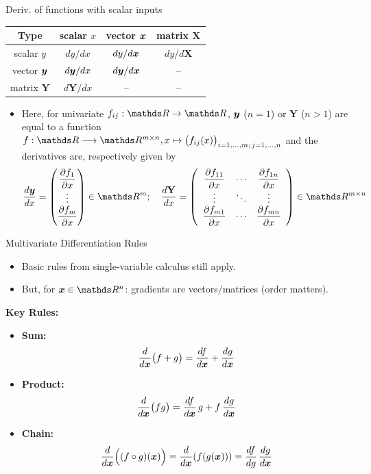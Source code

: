 \documentclass[11pt,compress,t,notes=noshow, xcolor=table]{beamer}
\begin{document}
\begin{framev}{Deriv. of functions with scalar inputs}
\begin{table}
\centering
\begin{tabular}{c||c|c|c}
Type & scalar $x$ & vector $\bm{x}$ & matrix $\mathbf{X}$ \\ \hline\hline
scalar $y$ & $d y / d x$ & $d y / d\bm{x}$ & $d y / d\mathbf{X}$ \\ \hline
vector $\bm{y}$ & \cellcolor{blue!20}$d\bm{y} / d x$ & $d\bm{y} / d\bm{x}$ & -- \\ \hline
matrix $\mathbf{Y}$ & \cellcolor{blue!20}$d\mathbf{Y} / d x$ & -- & --
\end{tabular}
\end{table}
\begin{itemize}
\item  Here, for univariate $f_{ij}:\R\rightarrow\R$, $\bm{y}$ ($n=1$) or $\mathbf{Y}$ ($n>1$) are equal to a function $f: \R\longrightarrow\R^{m\times n}, x\mapsto \big(f_{ij}(x)\big)_{i=1,\dots,m;\,j=1,\dots,n}$ and the derivatives are, respectively given by $$
\frac{d\yv}{d x}=\begin{pmatrix}
\dfrac{\partial f_{1}}{\partial x}\\\vdots\\ \dfrac{\partial f_{m}}{\partial x}
\end{pmatrix}\in\R^m;\quad
\frac{d\mathbf{Y}}{d x}=\left(\begin{array}{ccc}
\dfrac{\partial f_{11}}{\partial x} & \cdots & \dfrac{\partial f_{1 n}}{\partial x} \\
\vdots & \ddots & \vdots \\
\dfrac{\partial f_{m 1}}{\partial x} & \cdots & \dfrac{\partial f_{m n}}{\partial x}
\end{array}\right) \in \R^{m \times n}$$
\end{itemize}
\end{framev}


\begin{framev}{Multivariate Differentiation Rules}
\begin{itemize}
\item Basic rules from single-variable calculus still apply.
\item But, for $\xv\in\R^{n}$: gradients are vectors/matrices (order matters).
\end{itemize}
\spacer
\textbf{Key Rules:}\\
\begin{itemize}
\item \textbf{Sum:}
$$
\frac{d}{d \bm{x}}\bigl(f+g\bigr)=\frac{d f}{d \bm{x}}+\frac{d g}{d \bm{x}}
$$
\item \textbf{Product:}
$$
\frac{d}{d \bm{x}}\bigl(fg\bigr)=\frac{d f}{d \bm{x}}\,g+f\,\frac{d g}{d \bm{x}}
$$
\item \textbf{Chain:}
$$
\frac{d}{d \bm{x}}\Bigl((f\circ g)(\bm{x})\Bigr)=\dfrac{d}{d \bm{x}}(f(g(\bm{x})))=\frac{d f}{d g}\,\frac{d g}{d \bm{x}}
$$
\end{itemize}
\end{framev}
\end{document}
